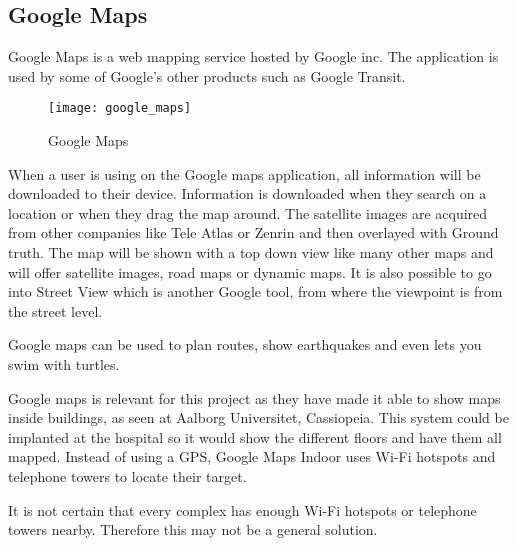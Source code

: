 \subsection{Google Maps}
Google Maps is a web mapping service hosted by Google inc. The application is used by some of Google's other products such as Google Transit\cite{Goo_transist}. 

\begin{figure}[ht!]
    \centering
    \texttt{[image: google\_maps]}
    \caption{Google Maps}
    \label{fig:google_maps}
  \end{figure}

When a user is using on the Google maps application, all information will be downloaded to their device. Information is downloaded when they search on a location or when they drag the map around\cite{Goo_input}. The satellite images are acquired from other companies like Tele Atlas\cite{Goo_Tele} or Zenrin\cite{Goo_Zenrin} and then overlayed with Ground truth\cite{Goo_GT}.
The map will be shown with a top down view like many other maps and will offer satellite images, road maps or dynamic maps. It is also possible to go into Street View which is another Google tool, from where the viewpoint is from the street level\cite{Goo_street}.

Google maps can be used to plan routes, show earthquakes and even lets you swim with turtles\cite{Goo_Turtle}.

Google maps is relevant for this project as they have made it able to show maps inside buildings, as seen at Aalborg Universitet, Cassiopeia\cite{Goo_Indoor}. This system could be implanted at the hospital so it would show the different floors and have them all mapped. Instead of using a GPS, Google Maps Indoor uses Wi-Fi hotspots and telephone towers to locate their target\cite{Goo_Indoor}.

It is not certain that every complex has enough Wi-Fi hotspots or telephone towers nearby. Therefore this may not be a general solution.